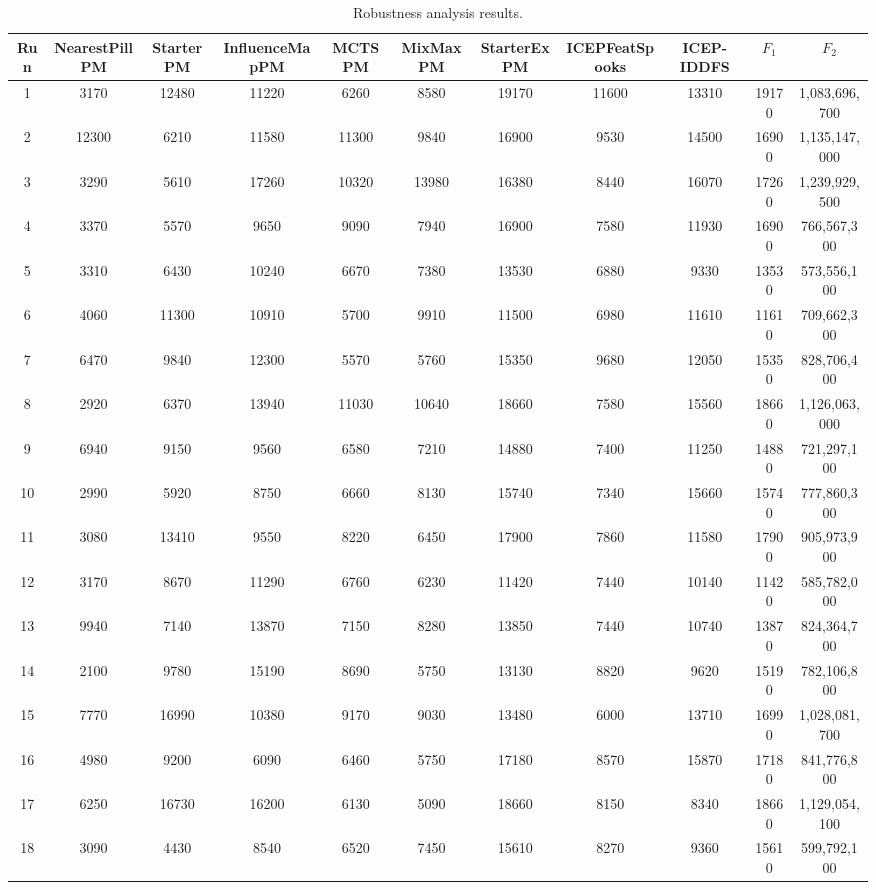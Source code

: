 \documentclass[journal]{IEEEtran}
\begin{document}
\begin{table}
\caption{Robustness analysis results.}
\label{tab:results_robust}
\centering
\footnotesize
\begin{tabular}{|c|cccccccc|cc|}
\hline
Run	&	NearestPillPM	&	StarterPM	&	InfluenceMapPM	&	MCTSPM	&	MixMaxPM	&	StarterExPM	&	ICEPFeatSpooks	&	ICEP-IDDFS	&	$F_1$	&	$F_2$	\\
\hline
1	&	3170	&	12480	&	11220	&	6260	&	8580	&	19170	&	11600	&	13310	&	19170	&	1,083,696,700	\\
2	&	12300	&	6210	&	11580	&	11300	&	9840	&	16900	&	9530	&	14500	&	16900	&	1,135,147,000	\\
3	&	3290	&	5610	&	17260	&	10320	&	13980	&	16380	&	8440	&	16070	&	17260	&	1,239,929,500	\\
4	&	3370	&	5570	&	9650	&	9090	&	7940	&	16900	&	7580	&	11930	&	16900	&	766,567,300	\\
5	&	3310	&	6430	&	10240	&	6670	&	7380	&	13530	&	6880	&	9330	&	13530	&	573,556,100	\\
6	&	4060	&	11300	&	10910	&	5700	&	9910	&	11500	&	6980	&	11610	&	11610	&	709,662,300	\\
7	&	6470	&	9840	&	12300	&	5570	&	5760	&	15350	&	9680	&	12050	&	15350	&	828,706,400	\\
8	&	2920	&	6370	&	13940	&	11030	&	10640	&	18660	&	7580	&	15560	&	18660	&	1,126,063,000	\\
9	&	6940	&	9150	&	9560	&	6580	&	7210	&	14880	&	7400	&	11250	&	14880	&	721,297,100	\\
10	&	2990	&	5920	&	8750	&	6660	&	8130	&	15740	&	7340	&	15660	&	15740	&	777,860,300	\\
11	&	3080	&	13410	&	9550	&	8220	&	6450	&	17900	&	7860	&	11580	&	17900	&	905,973,900	\\
12	&	3170	&	8670	&	11290	&	6760	&	6230	&	11420	&	7440	&	10140	&	11420	&	585,782,000	\\
13	&	9940	&	7140	&	13870	&	7150	&	8280	&	13850	&	7440	&	10740	&	13870	&	824,364,700	\\
14	&	2100	&	9780	&	15190	&	8690	&	5750	&	13130	&	8820	&	9620	&	15190	&	782,106,800	\\
15	&	7770	&	16990	&	10380	&	9170	&	9030	&	13480	&	6000	&	13710	&	16990	&	1,028,081,700	\\
16	&	4980	&	9200	&	6090	&	6460	&	5750	&	17180	&	8570	&	15870	&	17180	&	841,776,800	\\
17	&	6250	&	16730	&	16200	&	6130	&	5090	&	18660	&	8150	&	8340	&	18660	&	1,129,054,100	\\
18	&	3090	&	4430	&	8540	&	6520	&	7450	&	15610	&	8270	&	9360	&	15610	&	599,792,100	\\

\end{tabular}
\end{table}
\end{document}
